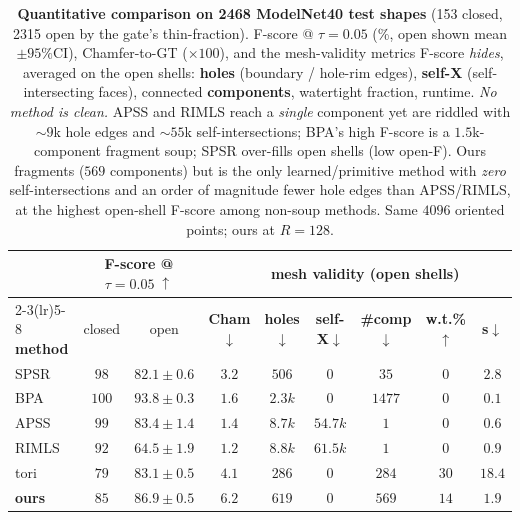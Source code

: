 \begin{table}[t]\centering\footnotesize
\begin{tabular}{lcccccccc}
\toprule
 & \multicolumn{2}{c}{\textbf{F-score} @ $\tau{=}0.05\;\uparrow$} & & \multicolumn{4}{c}{\textbf{mesh validity (open shells)}} & \\
\cmidrule(lr){2-3}\cmidrule(lr){5-8}
\textbf{method} & closed & open & \textbf{Cham}$\downarrow$ & \textbf{holes}$\downarrow$ & \textbf{self-X}$\downarrow$ & \textbf{\#comp}$\downarrow$ & \textbf{w.t.\%}$\uparrow$ & \textbf{s}$\downarrow$ \\
\midrule
SPSR~\cite{kazhdan2013} & $98$ & $82.1\!\pm\!0.6$ & $3.2$ & $506$ & $0$ & $35$ & $0$ & $2.8$ \\
BPA~\cite{bernardini1999} & $100$ & $93.8\!\pm\!0.3$ & $1.6$ & $2.3k$ & $0$ & $1477$ & $0$ & $0.1$ \\
APSS~\cite{apss} & $99$ & $83.4\!\pm\!1.4$ & $1.4$ & $8.7k$ & $54.7k$ & $1$ & $0$ & $0.6$ \\
RIMLS~\cite{rimls} & $92$ & $64.5\!\pm\!1.9$ & $1.2$ & $8.8k$ & $61.5k$ & $1$ & $0$ & $0.9$ \\
tori~\cite{pat} & $79$ & $83.1\!\pm\!0.5$ & $4.1$ & $286$ & $0$ & $284$ & $30$ & $18.4$ \\
\midrule
\textbf{ours} & $85$ & $86.9\!\pm\!0.5$ & $6.2$ & $619$ & $0$ & $569$ & $14$ & $1.9$ \\
\bottomrule
\end{tabular}
\caption{\textbf{Quantitative comparison on 2468 ModelNet40 test shapes} (153 closed, 2315 open by the gate's thin-fraction).  F-score @ $\tau{=}0.05$ (\%, open shown mean$\pm95\%$CI), Chamfer-to-GT ($\times100$), and the mesh-validity metrics F-score \emph{hides}, averaged on the open shells: \textbf{holes} (boundary / hole-rim edges), \textbf{self-X} (self-intersecting faces), connected \textbf{components}, watertight fraction, runtime.  \emph{No method is clean.}  APSS and RIMLS reach a \emph{single} component yet are riddled with $\sim\!9$k hole edges and $\sim\!55$k self-intersections; BPA's high F-score is a $1.5$k-component fragment soup; SPSR over-fills open shells (low open-F).  Ours fragments ($569$ components) but is the only learned/primitive method with \emph{zero} self-intersections and an order of magnitude fewer hole edges than APSS/RIMLS, at the highest open-shell F-score among non-soup methods.  Same $4096$ oriented points; ours at $R{=}128$.}
\label{tab:quant}
\end{table}
